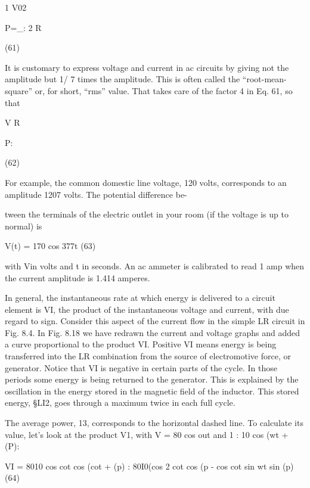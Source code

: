 {\begin{equation}
\end{equation}
1 V02

P=_:
2 R

(61)

It is customary to express voltage and current in ac circuits by giving
not the amplitude but 1/ \/7 times the amplitude. This is often called
the ``root-mean-square'' or, for short, ``rms'' value. That takes care
of the factor 4 in Eq. 61, so that

\begin{equation}
\end{equation}
V%
R

P:

(62)

For example, the common domestic line voltage, 120 volts, corresponds
to an amplitude 120\/7 volts. The potential difference be-

tween the terminals of the electric outlet in your room (if the voltage
is up to normal) is

\begin{equation}
\end{equation}
V(t) = 170 cos 377t (63)

with Vin volts and t in seconds. An ac ammeter is calibrated to read
1 amp when the current amplitude is 1.414 amperes.

In general, the instantaneous rate at which energy is delivered to
a circuit element is VI, the product of the instantaneous voltage and
current, with due regard to sign. Consider this aspect of the current
flow in the simple LR circuit in Fig. 8.4. In Fig. 8.18 we have redrawn
the current and voltage graphs and added a curve proportional to
the product VI. Positive VI means energy is being transferred into
the LR combination from the source of electromotive force, or
generator. Notice that VI is negative in certain parts of the cycle.
In those periods some energy is being returned to the generator.
This is explained by the oscillation in the energy stored in the magnetic
field of the inductor. This stored energy, §LI2, goes through
a maximum twice in each full cycle.

The average power, 13, corresponds to the horizontal dashed line.
To calculate its value, let's look at the product V1, with V = 80 cos out
and 1 : 10 cos (wt + (P):

\begin{equation}
\end{equation}
VI = 8010 cos cot cos (cot + (p)
: 80I0(cos 2 cot cos (p - cos cot sin wt sin (p) (64)

}
